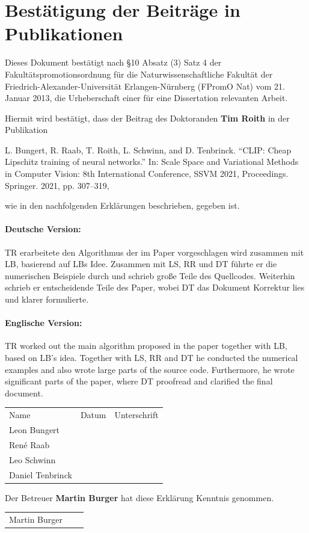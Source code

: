 \documentclass[12pt]{article}
\begin{document}
\section*{Bestätigung der Beiträge in Publikationen}

Dieses Dokument bestätigt nach \S10 Absatz (3) Satz 4 der Fakultätspromotionsordnung für die Naturwissenschaftliche Fakultät der
Friedrich-Alexander-Universität Erlangen-Nürnberg (FPromO Nat) vom 21. Januar 2013, die Urheberschaft einer für eine Dissertation relevanten Arbeit.\par

\vspace{15pt}
\noindent
Hiermit wird bestätigt, dass der Beitrag des Doktoranden \textbf{Tim Roith} in der Publikation
%
\begin{center}
L. Bungert, R. Raab, T. Roith, L. Schwinn, and D. Tenbrinck. “CLIP:
Cheap Lipschitz training of neural networks.” In: Scale Space and Variational
Methods in Computer Vision: 8th International Conference, SSVM
2021, Proceedings. Springer. 2021, pp. 307–319,
\end{center}
%
wie in den nachfolgenden Erklärungen beschrieben, gegeben ist.

\paragraph{Deutsche Version:} TR erarbeitete den Algorithmus der im Paper vorgeschlagen wird zusammen mit LB, basierend auf LBs Idee. Zusammen mit LS, RR und DT führte er die numerischen Beispiele durch und schrieb große Teile des Quellcodes. Weiterhin schrieb er entscheidende Teile des Paper, wobei DT das Dokument Korrektur lies und klarer formulierte.

\paragraph{Englische Version:} TR worked out the main algorithm proposed in the paper together with LB, based on LB's idea. Together with LS, RR and DT he conducted the numerical examples and also wrote large parts of the source code. Furthermore, he wrote significant parts of the paper, where DT proofread and clarified the final document.
\vspace{30pt}

\renewcommand{\arraystretch}{3.5}
\begin{tabular}{l l l}
Name & Datum & Unterschrift\\
Leon Bungert & \raisebox{-3pt}{\makebox[5cm]{.\dotfill}} & \raisebox{-3pt}{\makebox[5cm]{.\dotfill}}\\
René Raab & \raisebox{-3pt}{\makebox[5cm]{.\dotfill}} & \raisebox{-3pt}{\makebox[5cm]{.\dotfill}}\\
%
Leo Schwinn & \raisebox{-3pt}{\makebox[5cm]{.\dotfill}} & \raisebox{-3pt}{\makebox[5cm]{.\dotfill}}\\
Daniel Tenbrinck & \raisebox{-3pt}{\makebox[5cm]{.\dotfill}} & \raisebox{-3pt}{\makebox[5cm]{.\dotfill}}\\
\end{tabular}%
%

\vspace{30pt}
\noindent
Der Betreuer \textbf{Martin Burger} hat diese Erklärung Kenntnis genommen.

\begin{tabular}{l l l}
	Martin Burger & \raisebox{-3pt}{\makebox[5cm]{.\dotfill}} & \raisebox{-3pt}{\makebox[5cm]{.\dotfill}}
\end{tabular}%

 
\end{document}
